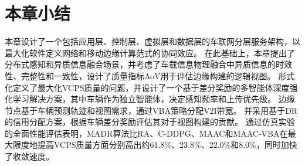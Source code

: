 \section{本章小结}\label{section 2-7}

本章设计了一个包括应用层、控制层、虚拟层和数据层的车联网分层服务架构，以最大化软件定义网络和移动边缘计算范式的协同效应。
在此基础上，本章提出了分布式感知和异质信息融合场景，并考虑了车载信息物理融合中异质信息的时效性、完整性和一致性，设计了质量指标AoV用于评估边缘构建的逻辑视图。
形式化定义了最大化VCPS质量的问题，并设计了一个基于差分奖励的多智能体深度强化学习解决方案，其中车辆作为独立智能体，决定感知频率和上传优先级。
边缘节点基于车辆预测轨迹和视图需求，通过VBA策略分配V2I带宽。
并采用基于DR的信用分配方案，根据车辆差分奖励评估其对于视图构建的贡献。
通过仿真实验的全面性能评估表明，MADR算法比RA、C-DDPG、MAAC和MAAC-VBA在最大限度地提高VCPS质量方面分别高出约61.8\%、23.8\%、22.0\%和8.0\%，同时加快了收敛速度。